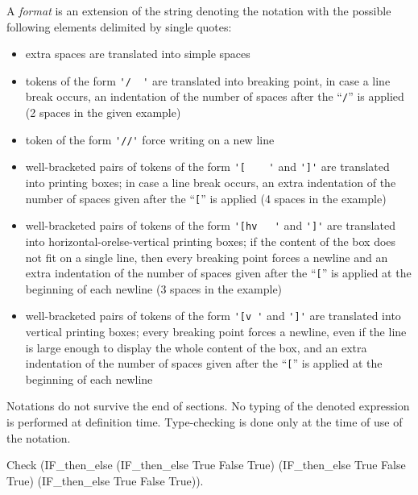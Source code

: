 A {\em format} is an extension of the string denoting the notation with
the possible following elements delimited by single quotes:

\begin{itemize}
\item extra spaces are translated into simple spaces
\item tokens of the form \verb='/  '= are translated into breaking point,
  in case a line break occurs, an indentation of the number of spaces
  after the ``\verb=/='' is applied (2 spaces in the given example)
\item token of the form \verb='//'= force writing on a new line
\item well-bracketed pairs of tokens of the form \verb='[    '= and \verb=']'=
  are translated into printing boxes; in case a line break occurs,
  an extra indentation of the number of spaces given after the ``\verb=[=''
  is applied (4 spaces in the example)
\item well-bracketed pairs of tokens of the form \verb='[hv   '= and \verb=']'=
  are translated into horizontal-orelse-vertical printing boxes; 
  if the content of the box does not fit on a single line, then every breaking
  point forces a newline and an extra  indentation of the number of spaces
  given after the ``\verb=[='' is applied at the beginning of each newline
  (3 spaces in the example)
\item well-bracketed pairs of tokens of the form \verb='[v '= and
  \verb=']'= are translated into vertical printing boxes; every
  breaking point forces a newline, even if the line is large enough to
  display the whole content of the box, and an extra indentation of the
  number of spaces given after the ``\verb=[='' is applied at the beginning
  of each newline
\end{itemize}


Notations do not survive the end of sections. No typing of the denoted
expression is performed at definition time. Type-checking is done only
at the time of use of the notation.

\begin{coq_example}
Check 
 (IF_then_else (IF_then_else True False True) 
   (IF_then_else True False True)
   (IF_then_else True False True)).   
\end{coq_example}

